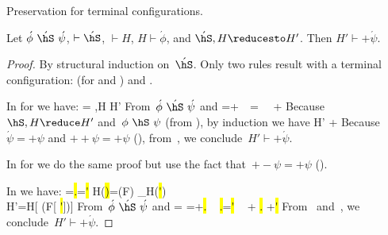 Preservation for terminal configurations.
\begin{lemma}
\label{Lemma:Preservation1}
Let $\acute{\phi}~\acute{\hS}~\acute{\psi}$, $\vdash \acute{\hS}$, $\vdash H$, $H \vdash \acute{\phi}$, and $\acute{\hS},H \reducesto H'$.
Then $H' \vdash +\acute{\psi}$.
\end{lemma}
\begin{proof}
By structural induction on~$\acute{\hS}$.
Only two rules result with a terminal configuration:
     (for \hfinish and \hasync)
    and .


In  for \hfinish we have:
    \acute{\hS}=\finish{\hS} \gap \hS,H \reduce H'
\eeq
From~$\acute{\phi}~\acute{\hS}~\acute{\psi}$ and 
    \acute{\psi}=+\psi \gap \phi~\hS~\psi \gap \acute{\phi}=\phi \gap \phi~\finish{\hS}~ +\psi
\eeq
Because $\hS,H \reduce H'$ and~$\phi~\hS~\psi$ (from ), by induction we have
    H' \vdash +\phi
\eeq
Because~$\acute{\psi}=+\psi$ and $++\psi=+\psi$ (), from~, we conclude~$H' \vdash +\acute{\psi}$.

In  for \hasync we do the same proof but use the fact that~$+-\psi=+\psi$ ().

In  we have:
    \acute{\hS}=\hl.\hf=\hl' \gap H(\hl)=\hC(F) \gap \cooked_H(\hl')
    \\ H'=H[ \hl \mapsto \hC(F[ \hf \mapsto \hl'])]
\eeq
From~$\acute{\phi}~\acute{\hS}~\acute{\psi}$ and 
    \acute{\phi}=\phi
    \gap
    \acute{\psi}=+\hl.\hf
    \gap
    \phi ~ \hl.\hf=\hl' ~ + \hl.\hf
    \gap
    \phi \vdash +\hl'
\eeq
From~ and~, we conclude~$H' \vdash +\acute{\psi}$.
\end{proof}


